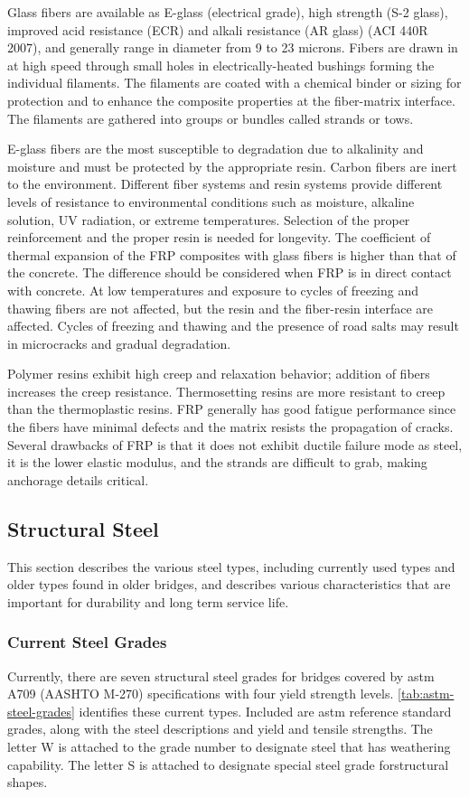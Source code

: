 Glass fibers are available as E-glass (electrical grade), high strength (S-2 glass), improved acid resistance (ECR) and alkali resistance (AR glass) (ACI 440R 2007), and generally range in diameter from 9 to 23 microns. Fibers are drawn in at high speed through small holes in electrically-heated bushings forming the individual filaments. The filaments are coated with a chemical binder or sizing for protection and to enhance the composite properties at the fiber-matrix interface. The filaments are gathered into groups or bundles called strands or tows.

E-glass fibers are the most susceptible to degradation due to alkalinity and moisture and must be protected by the appropriate resin. Carbon fibers are inert to the environment. Different fiber systems and resin systems provide different levels of resistance to environmental conditions such as moisture, alkaline solution, UV radiation, or extreme temperatures. Selection of the proper reinforcement and the proper resin is needed for longevity. The coefficient of thermal expansion of the FRP composites with glass fibers is higher than that of the concrete. The difference should be considered when FRP is in direct contact with concrete. At low temperatures and exposure to cycles of freezing and thawing fibers are not affected, but the resin and the fiber-resin interface are affected. Cycles of freezing and thawing and the presence of road salts may result in microcracks and gradual degradation.

Polymer resins exhibit high creep and relaxation behavior; addition of fibers increases the creep resistance.  Thermosetting resins are more resistant to creep than the thermoplastic resins. FRP generally has good fatigue performance since the fibers have minimal defects and the matrix resists the propagation of cracks. Several drawbacks of FRP is that it does not exhibit ductile failure mode as steel, it is the lower elastic modulus, and the strands are difficult to grab, making anchorage details critical.

\subsection{Structural Steel}
This section describes the various steel types, including currently used types and older types found in older bridges, and describes various characteristics that are important for durability and long term service life.

\subsubsection{Current Steel Grades}
Currently, there are seven structural steel grades for bridges covered by \acrshort*{astm} A709 (AASHTO M-270) specifications with four yield strength levels. \cref{tab:astm-steel-grades} identifies these current types. Included are \acrshort*{astm} reference standard grades, along with the steel descriptions and yield and tensile strengths. The letter W is attached to the grade number to designate steel that has weathering capability. The letter S is attached to designate special steel grade forstructural shapes.

